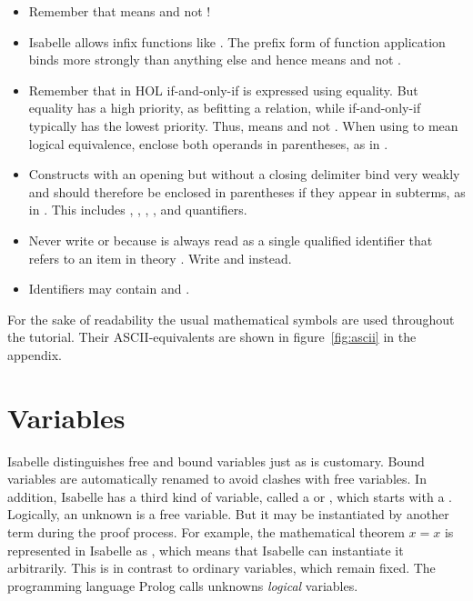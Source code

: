 \begin{itemize}
\item
Remember that  means  and not !
\item
Isabelle allows infix functions like \isa{+}. The prefix form of function
application binds more strongly than anything else and hence 
means  and not .
\item Remember that in HOL if-and-only-if is expressed using equality.  But
  equality has a high priority, as befitting a relation, while if-and-only-if
  typically has the lowest priority.  Thus,  means  and not
  . When using \isa{=} to mean
  logical equivalence, enclose both operands in parentheses, as in .
\item
Constructs with an opening but without a closing delimiter bind very weakly
and should therefore be enclosed in parentheses if they appear in subterms, as
in . This includes ,
, , \isa{\isasymlambda}, and quantifiers.
\item
Never write  or 
because  is always read as a single qualified identifier that
refers to an item  in theory . Write
 and  instead.
\item Identifiers may contain \isa{_} and .
\end{itemize}

For the sake of readability the usual mathematical symbols are used throughout
the tutorial. Their ASCII-equivalents are shown in figure~\ref{fig:ascii} in
the appendix.


\section{Variables}
\label{sec:variables}

Isabelle distinguishes free and bound variables just as is customary. Bound
variables are automatically renamed to avoid clashes with free variables. In
addition, Isabelle has a third kind of variable, called a  or , which starts
with a .  Logically, an unknown is a free variable. But it may be
instantiated by another term during the proof process. For example, the
mathematical theorem $x = x$ is represented in Isabelle as ,
which means that Isabelle can instantiate it arbitrarily. This is in contrast
to ordinary variables, which remain fixed. The programming language Prolog
calls unknowns {\em logical\/} variables.

